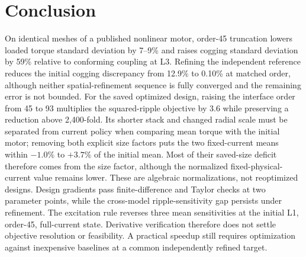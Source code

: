 \documentclass{anvil-paper}
\begin{document}
\section{Conclusion}
On identical meshes of a published nonlinear motor, order-45 truncation
lowers loaded torque standard deviation by 7--9\% and raises cogging
standard deviation by 59\% relative to conforming coupling at L3.
Refining the independent reference reduces the initial cogging discrepancy
from 12.9\% to 0.10\% at matched order, although neither spatial-refinement
sequence is fully converged and the remaining error is not bounded. For the saved optimized
design, raising the interface order from 45 to 93 multiplies the
squared-ripple objective by 3.6 while preserving a reduction above
2,400-fold. Its shorter stack and changed radial scale must be separated
from current policy when comparing mean torque with the initial motor;
removing both explicit size factors puts the two fixed-current means
within $-1.0\%$ to $+3.7\%$ of the initial mean. Most of their saved-size
deficit therefore comes from the size factor, although the normalized
fixed-physical-current value remains lower. These are algebraic
normalizations, not reoptimized designs.
Design gradients pass finite-difference and Taylor checks at two parameter
points, while the cross-model ripple-sensitivity gap persists under
refinement. The excitation rule reverses three mean sensitivities at the
initial L1, order-45, full-current state. Derivative verification therefore
does not settle objective resolution or feasibility. A practical speedup
still requires optimization against inexpensive baselines at a common
independently refined target.
\end{document}
